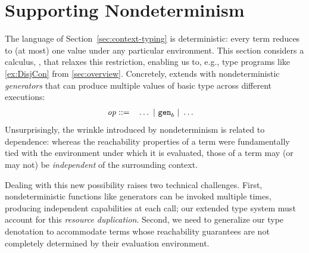 \section{Supporting Nondeterminism}
\label{sec:extension}

The \langname{} language of Section~\ref{sec:context-typing} is
deterministic: every term reduces to (at most) one value under any
particular environment. This section considers a calculus,
\langNDname{}, that relaxes this restriction, enabling us to, e.g.,
type programs like \ref{ex:DisjCon} from
\autoref{sec:overview}. Concretely, \langNDname{} extends \langname{}
with nondeterministic \emph{generators} that can produce multiple
values of basic type across different executions:
\vspace{-0.2em}
\begin{align*}
  \mathit{op} ::= \quad & \ldots ~|~ {\tt gen}_b ~|~ \ldots
\end{align*}
Unsurprisingly, the wrinkle introduced by nondeterminism is related to
dependence: whereas the reachability properties of a \langname{} term
were fundamentally tied with the environment under which it is
evaluated, those of a \langNDname{} term may (or may not) be
\emph{independent} of the surrounding context.

Dealing with this new possibility raises two technical
challenges. First, nondeterministic functions like generators can be
invoked multiple times, producing independent capabilities at each
call; our extended type system must account for this \emph{resource
  duplication}.  Second, we need to generalize our type denotation to
accommodate terms whose reachability guarantees are not completely
determined by their evaluation environment.



